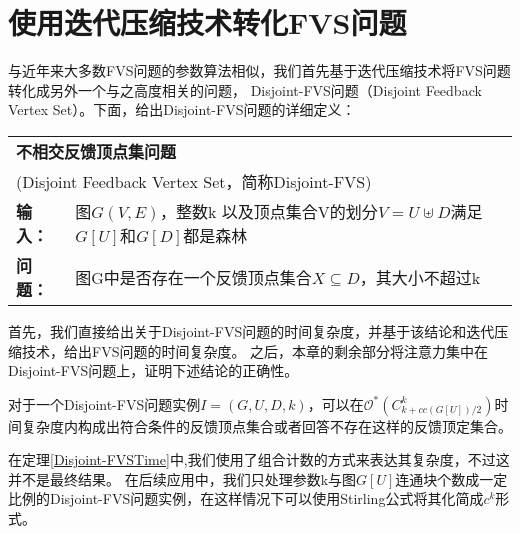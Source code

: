 \section{使用迭代压缩技术转化FVS问题}
与近年来大多数FVS问题的参数算法相似，我们首先基于迭代压缩技术将FVS问题转化成另外一个与之高度相关的问题，
Disjoint-FVS问题（Disjoint Feedback Vertex Set）。下面，给出Disjoint-FVS问题的详细定义：\\

\begin{tabular}{ | p{0.06\headwidth} p{0.80\headwidth} | }
  \hline
  \multicolumn{2}{|l|}{ \textbf{不相交反馈顶点集问题} }\\
  \multicolumn{2}{|l|}{ (Disjoint Feedback Vertex Set，简称Disjoint-FVS)}\\
  \textbf{输入：} & 图$G(V, E)$，整数k 以及顶点集合V的划分$V = U \uplus D$满足$G[U]$和$G[D]$都是森林\\
  \textbf{问题：} & 图G中是否存在一个反馈顶点集合$X \subseteq D$，其大小不超过k\\
  \hline
\end{tabular} \vspace{0.5cm}

首先，我们直接给出关于Disjoint-FVS问题的时间复杂度，并基于该结论和迭代压缩技术，给出FVS问题的时间复杂度。
之后，本章的剩余部分将注意力集中在Disjoint-FVS问题上，证明下述结论的正确性。
\begin{theorem} \label{Disjoint-FVSTime}
  对于一个Disjoint-FVS问题实例$I = (G, U, D, k)$，可以在$\mathcal{O}^*(C^k_{k + cc(G[U])/2})$时间复杂度内构成出符合条件的反馈顶点集合或者回答不存在这样的反馈顶定集合。
\end{theorem}

在定理\ref{Disjoint-FVSTime}中,我们使用了组合计数的方式来表达其复杂度，不过这并不是最终结果。
在后续应用中，我们只处理参数k与图$G[U]$连通块个数成一定比例的Disjoint-FVS问题实例，在这样情况下可以使用Stirling公式将其化简成$c^k$形式。

